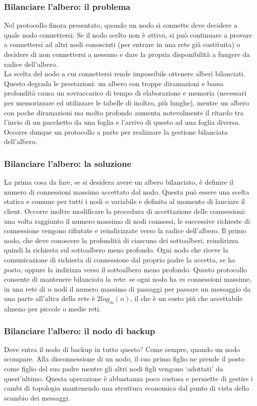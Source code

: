 \documentclass[10pt]{article} %
\begin{document}
\subsubsection{Bilanciare l'albero: il problema}
Nel protocollo finora presentato, quando un nodo si connette deve decidere a quale nodo connettersi. Se il nodo scelto non è attivo, si può continuare a provare a connettersi ad altri nodi conosciuti (per entrare in una rete già costituita) o decidere di non connettersi a nessuno e dare la propria disponibilità a fungere da radice dell'albero.\\
La scelta del nodo a cui connettersi rende impossibile ottenere alberi bilanciati. Questo degrada le prestazioni: un albero con troppe diramazioni e bassa profondità causa un sovraccarico di tempo di elaborazione e memoria (necessari per memorizzare ed utilizzare le tabelle di inoltro, più lunghe), mentre un albero con poche diramazioni ma molto profondo aumenta notevolmente il ritardo tra l'invio di un pacchetto da una foglia e l'arrivo di questo ad una foglia diversa. Occorre dunque un protocollo a parte per realizzare la gestione bilanciata dell'albero.
\subsubsection{Bilanciare l'albero: la soluzione}
La prima cosa da fare, se si desidera avere un albero bilanciato, è definire il numero di connessioni massimo accettato dal nodo. Questa può essere una scelta statica e comune per tutti i nodi o variabile e definita al momento di lanciare il client. Occorre inoltre modificare la procedura di accettazione delle connessioni: una volta raggiunto il numero massimo di nodi connessi, le successive richieste di connessione vengono rifiutate e reindirizzate verso la radice dell'albero. Il primo nodo, che deve conoscere la profondità di ciascuno dei sottoalberi, reindirizza quindi la richiesta sul sottoalbero meno profondo. Ogni nodo che riceve la comunicazione di richiesta di connessione dal proprio padre la accetta, se ha posto, oppure la indirizza verso il sottoalbero meno profondo. Questo protocollo consente di mantenere bilanciata la rete: se ogni nodo ha $m$ connessioni massime, in una rete di $n$ nodi il numero massimo di passaggi per passare un messaggio da una parte all'altra della rete è $2log_m(n)$, il che è un costo più che accettabile almeno per piccole o medie reti.
\subsubsection{Bilanciare l'albero: il nodo di backup}
Dove entra il nodo di backup in tutto questo? Come sempre, quando un nodo scompare. Alla disconnessione di un nodo, il suo primo figlio ne prende il posto come figlio del suo padre mentre gli altri nodi figli vengono `adottati' da quest'ultimo. Questa operazione è abbastanza poco costosa e permette di gestire i cambi di topologia mantenendo una struttura economica dal punto di vista dello scambio dei messaggi.
\end{document}
